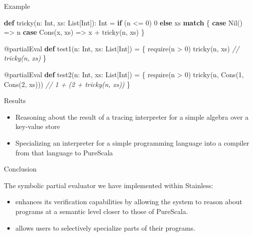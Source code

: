 \documentclass[ignorenonframetext,]{beamer}
\newenvironment{Shaded}{}{}
\newcommand{\CommentTok}[1]{\textcolor[rgb]{0.38,0.63,0.69}{\textit{#1}}}
\newcommand{\DecValTok}[1]{\textcolor[rgb]{0.25,0.63,0.44}{#1}}
\newcommand{\FunctionTok}[1]{\textcolor[rgb]{0.02,0.16,0.49}{#1}}
\newcommand{\KeywordTok}[1]{\textcolor[rgb]{0.00,0.44,0.13}{\textbf{#1}}}
\newcommand{\NormalTok}[1]{#1}
\providecommand{\tightlist}{%
  \setlength{\itemsep}{0pt}\setlength{\parskip}{0pt}}
\begin{document}
\begin{frame}[fragile]{%
\protect\hypertarget{example}{%
Example}}

\begin{Shaded}
\begin{Highlighting}[]
\KeywordTok{def} \FunctionTok{tricky}\NormalTok{(n: Int, xs: List[Int]): Int =}
  \KeywordTok{if}\NormalTok{ (n <= }\DecValTok{0}\NormalTok{) }\DecValTok{0} \KeywordTok{else}\NormalTok{ xs }\KeywordTok{match}\NormalTok{ \{}
    \KeywordTok{case} \FunctionTok{Nil}\NormalTok{()       => n}
    \KeywordTok{case} \FunctionTok{Cons}\NormalTok{(x, xs) => x + }\FunctionTok{tricky}\NormalTok{(n, xs)}
\NormalTok{  \}}

\NormalTok{@partialEval }\KeywordTok{def} \FunctionTok{test1}\NormalTok{(n: Int, xs: List[Int]) = \{}
  \FunctionTok{require}\NormalTok{(n > }\DecValTok{0}\NormalTok{)}
  \FunctionTok{tricky}\NormalTok{(n, xs) }\CommentTok{// tricky(n, xs)}
\NormalTok{\}}

\NormalTok{@partialEval }\KeywordTok{def} \FunctionTok{test2}\NormalTok{(n: Int, xs: List[Int]) = \{}
  \FunctionTok{require}\NormalTok{(n > }\DecValTok{0}\NormalTok{)}
  \FunctionTok{tricky}\NormalTok{(n, }\FunctionTok{Cons}\NormalTok{(}\DecValTok{1}\NormalTok{, }\FunctionTok{Cons}\NormalTok{(}\DecValTok{2}\NormalTok{, xs))) }\CommentTok{// 1 + (2 + tricky(n, xs))}
\NormalTok{\}}
\end{Highlighting}
\end{Shaded}

\end{frame}

\begin{frame}{%
\protect\hypertarget{results}{%
Results}}

\begin{itemize}
\tightlist
\item
  Reasoning about the result of a tracing interpreter for a simple
  algebra over a key-value store
\item
  Specializing an interpreter for a simple programming language into a
  compiler from that language to PureScala
\end{itemize}

\end{frame}

\begin{frame}{%
\protect\hypertarget{conclusion}{%
Conclusion}}

The symbolic partial evaluator we have implemented within Stainless:

\begin{itemize}
\tightlist
\item
  enhances its verification capabilities by allowing the system to
  reason about programs at a semantic level closer to those of
  PureScala.
\item
  allows users to selectively specialize parts of their programs.
\end{itemize}

\end{frame}
\end{document}
